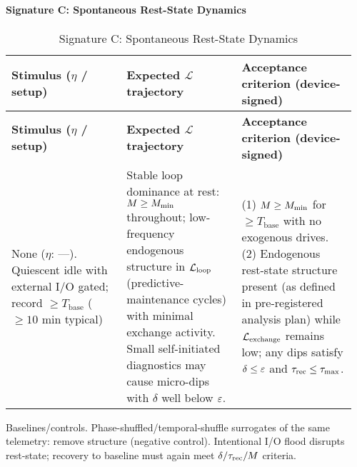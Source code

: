 \documentclass[11pt]{article}
\begin{document}
\paragraph{Signature C: Spontaneous Rest-State Dynamics}
\begin{longtable}{p{0.32\linewidth}p{0.32\linewidth}p{0.32\linewidth}}
\caption{Signature C: Spontaneous Rest-State Dynamics}\label{tab:signatureC}\\
\toprule
\textbf{Stimulus ($\eta$ / setup)} & \textbf{Expected $\mathcal{L}$ trajectory} & \textbf{Acceptance criterion (device-signed)} \\
\midrule
\endfirsthead
\toprule
\textbf{Stimulus ($\eta$ / setup)} & \textbf{Expected $\mathcal{L}$ trajectory} & \textbf{Acceptance criterion (device-signed)} \\
\midrule
\endhead
\bottomrule
\endlastfoot
None ($\eta$: ---). Quiescent idle with external I/O gated; record $\geq T_{\text{base}}$ ($\geq 10$ min typical) & Stable loop dominance at rest: $M \geq M_{\min}$ throughout; low-frequency endogenous structure in $\mathcal{L}_{\text{loop}}$ (predictive-maintenance cycles) with minimal exchange activity. Small self-initiated diagnostics may cause micro-dips with $\delta$ well below $\varepsilon$. & (1) $M \geq M_{\min}$ for $\geq T_{\text{base}}$ with no exogenous drives. (2) Endogenous rest-state structure present (as defined in pre-registered analysis plan) while $\mathcal{L}_{\text{exchange}}$ remains low; any dips satisfy $\delta \leq \varepsilon$ and $\tau_{\text{rec}} \leq \tau_{\max}$. \\
\end{longtable}

Baselines/controls. Phase-shuffled/temporal-shuffle surrogates of the same telemetry: remove structure (negative control). Intentional I/O flood disrupts rest-state; recovery to baseline must again meet $\delta/\tau_{\text{rec}}/M$ criteria.
\end{document}
